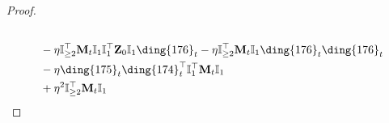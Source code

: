 \documentclass{article}
\theoremstyle{plain}
\theoremstyle{remark}
\def\bY{\mathbf{Y}}
\def\bZ{\mathbf{Z}}
\newcommand{\cc}[1]{\text{\ding{\number\numexpr#1 + 171\relax}}}
\begin{document}
\begin{proof}
\begin{align*}
        \\
        &~~~~ 
            - \eta\mathbb{I}_{\ge2}^\top \mathbf{M}_{t}\mathbb{I}_{1}\mathbb{I}_{1}^\top\bZ_0\mathbb{I}_{1}\cc{5}_t 
            - \eta\mathbb{I}_{\ge2}^\top \mathbf{M}_{t}\mathbb{I}_{1}\cc{5}_t\cc{5}_t 
        \\
        &~~~~
            - \eta \cc{4}_t\cc{3}_t^\top\mathbb{I}_{1}^\top\mathbf{M}_{t} \mathbb{I}_{1}
        \\
        &~~~~
            + \eta^2 \mathbb{I}_{\ge2}^\top\mathbf{M}_{t}\mathbb{I}_{1}

\end{align*}
\end{proof}
\end{document}
